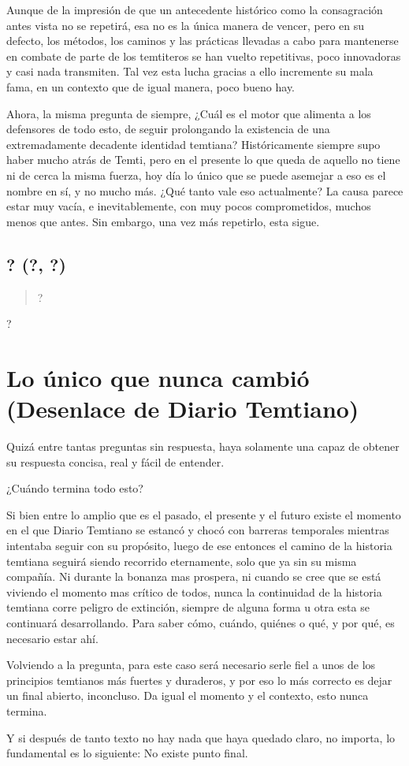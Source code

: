 \documentclass[
  spanish,
]{book}
\begin{document}
Aunque de la impresión de que un antecedente histórico como la consagración antes vista no se repetirá, esa no es la única manera de vencer, pero en su defecto, los métodos, los caminos y las prácticas llevadas a cabo para mantenerse en combate de parte de los temtiteros se han vuelto repetitivas, poco innovadoras y casi nada transmiten. Tal vez esta lucha gracias a ello incremente su mala fama, en un contexto que de igual manera, poco bueno hay.

Ahora, la misma pregunta de siempre, ¿Cuál es el motor que alimenta a los defensores de todo esto, de seguir prolongando la existencia de una extremadamente decadente identidad temtiana?
Históricamente siempre supo haber mucho atrás de Temti, pero en el presente lo que queda de aquello no tiene ni de cerca la misma fuerza, hoy día lo único que se puede asemejar a eso es el nombre en sí, y no mucho más. ¿Qué tanto vale eso actualmente?
La causa parece estar muy vacía, e inevitablemente, con muy pocos comprometidos, muchos menos que antes. Sin embargo, una vez más repetirlo, esta sigue.

\hypertarget{section}{%
\section{? (?, ?)}\label{section}}

\begin{quote}
?
\end{quote}

?

\hypertarget{lo-uxfanico-que-nunca-cambiuxf3-desenlace-de-diario-temtiano}{%
\chapter{Lo único que nunca cambió (Desenlace de Diario Temtiano)}\label{lo-uxfanico-que-nunca-cambiuxf3-desenlace-de-diario-temtiano}}

Quizá entre tantas preguntas sin respuesta, haya solamente una capaz de obtener su respuesta concisa, real y fácil de entender.

¿Cuándo termina todo esto?

Si bien entre lo amplio que es el pasado, el presente y el futuro existe el momento en el que Diario Temtiano se estancó y chocó con barreras temporales mientras intentaba seguir con su propósito, luego de ese entonces el camino de la historia temtiana seguirá siendo recorrido eternamente, solo que ya sin su misma compañía. Ni durante la bonanza mas prospera, ni cuando se cree que se está viviendo el momento mas crítico de todos, nunca la continuidad de la historia temtiana corre peligro de extinción, siempre de alguna forma u otra esta se continuará desarrollando. Para saber cómo, cuándo, quiénes o qué, y por qué, es necesario estar ahí.

Volviendo a la pregunta, para este caso será necesario serle fiel a unos de los principios temtianos más fuertes y duraderos, y por eso lo más correcto es dejar un final abierto, inconcluso. Da igual el momento y el contexto, esto nunca termina.

Y si después de tanto texto no hay nada que haya quedado claro, no importa, lo fundamental es lo siguiente: No existe punto final.
\end{document}

